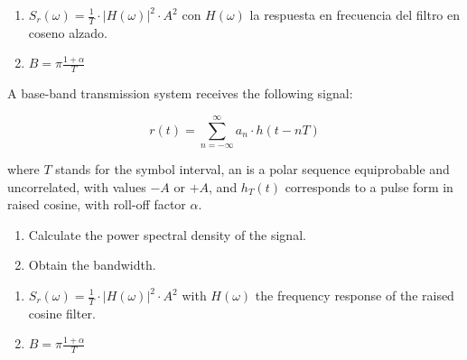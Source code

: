 \documentclass[en,boletin]{uah}
\begin{document}
{

\begin{enumerate}
	\item $S_r(\omega) = \frac{1}{T} \cdot |H(\omega)|^2 \cdot A^2$ con $H(\omega)$ la respuesta en frecuencia del filtro en coseno alzado.
	\item $B = \pi \frac{1+\alpha}{T}$
\end{enumerate}
}
{

A base-band transmission system receives the following signal:

\begin{displaymath}
	r(t) = \sum_{n=-\infty}^{\infty} a_n \cdot h(t-nT)
\end{displaymath}

where $T$ stands for the symbol interval, an is a polar sequence equiprobable and uncorrelated, with values $-A$ or $+A$, and $h_T(t)$ corresponds to a pulse form in raised cosine, with roll-off factor $\alpha$.

\begin{enumerate}
	\item Calculate the power spectral density of the signal.
	\item Obtain the bandwidth.
\end{enumerate}
	
}
{

\begin{enumerate}
	\item $S_r(\omega) = \frac{1}{T} \cdot |H(\omega)|^2 \cdot A^2$ with $H(\omega)$ the frequency response of the raised cosine filter.
	\item $B = \pi \frac{1+\alpha}{T}$
\end{enumerate}
}
\end{document}
